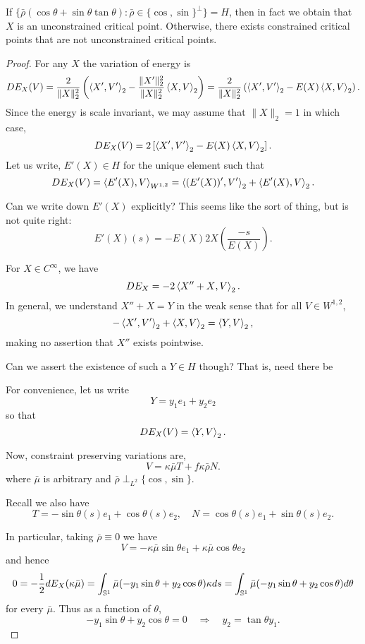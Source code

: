 \documentclass[12pt]{article}
\begin{document}
{\color{red} If \(\{\bar{\rho} (\cos\theta + \sin\theta\tan\theta) : \bar{\rho} \in \{\cos, \sin\}^{\perp}\} = H\), then in fact we obtain that \(X\) is an unconstrained critical point. Otherwise, there exists constrained critical points that are not unconstrained critical points.}

\begin{proof}
For any \(X\) the variation of energy is
\[
DE_X (V) = \frac{2}{\|X\|_2^2} \left(\left\langle{X'},{V'}\right\rangle_2 - \frac{\|X'\|_2^2}{\|X\|_2^2}\left\langle{X},{V}\right\rangle_2\right) = \frac{2}{\|X\|_2^2} \left(\left\langle{X'},{V'}\right\rangle_2 - E(X) \left\langle{X},{V}\right\rangle_2\right).
\]
Since the energy is scale invariant, we may assume that \(\|X\|_2 = 1\) in which case,
\[
DE_X (V) = 2\left[\left\langle{X'},{V'}\right\rangle_2 - E(X) \left\langle{X},{V}\right\rangle_2\right].
\]
Let us write, \(E'(X) \in H\) for the unique element such that
\[
DE_X(V) = \left\langle{E'(X)},{V}\right\rangle_{W^{1,2}} = \left\langle{(E'(X))'},{V'}\right\rangle_2 + \left\langle{E'(X)},{V}\right\rangle_2.
\]

{\color{red} Can we write down \(E'(X)\) explicitly? This seems like the sort of thing, but is not quite right:
\[
E'(X)(s) = -E(X) 2X\left(\frac{-s}{E(X)}\right).
\]
}

For \(X \in C^{\infty}\), we have
\[
DE_X = -2\left\langle{X'' + X},{V}\right\rangle_2.
\]
In general, we understand \(X'' + X = Y\) in the weak sense that for all \(V \in W^{1,2}\),
\[
-\left\langle{X'},{V'}\right\rangle_2 + \left\langle{X},{V}\right\rangle_2 = \left\langle{Y},{V}\right\rangle_2,
\]
making no assertion that \(X''\) exists pointwise.

{\color{red} Can we assert the existence of such a \(Y \in H\) though? That is, need there be}

For convenience, let us write
\[
Y = y_1 e_1 + y_2 e_2
\]
so that
\[
DE_X (V) = \left\langle{Y},{V}\right\rangle_2.
\]

Now, constraint preserving variations are,
\[
V = \kappa \bar{\mu} T + f\kappa\bar{\rho} N.
\]
where \(\bar{\mu}\) is arbitrary and \(\bar{\rho} \perp_{L^2} \{\cos,\sin\}\).

Recall we also have
\[
T = -\sin \theta(s) e_1 + \cos \theta(s) e_2, \quad N = \cos \theta(s) e_1 + \sin \theta(s) e_2.
\]

In particular, taking \(\bar{\rho} \equiv 0\) we have
\[
V = -\kappa\bar{\mu}\sin\theta e_1 + \kappa\bar{\mu}\cos\theta e_2
\]
and hence
\[
0 = -\frac{1}{2} dE_X(\kappa\bar{\mu}) = \int_{\operatorname{\mathbb{S}^1}} \bar{\mu}(-y_1 \sin\theta + y_2 \cos\theta) \kappa ds = \int_{\operatorname{\mathbb{S}^1}} \bar{\mu}(-y_1 \sin\theta + y_2 \cos\theta) d\theta
\]
for every \(\bar{\mu}\). Thus as a function of \(\theta\),
\[
-y_1 \sin\theta + y_2 \cos\theta = 0 \quad \Rightarrow \quad y_2 = \tan\theta y_1.
\]


\end{proof}
\end{document}
